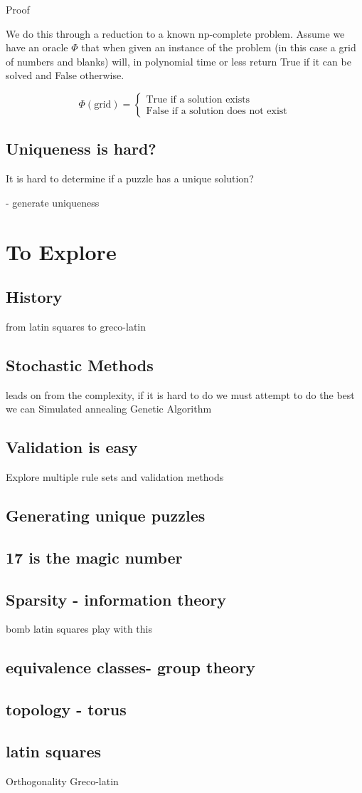 \documentclass[a4paper,12pt]{article}
\begin{document}
Proof

We do this through a reduction to a known np-complete problem.
Assume we have an oracle $\Phi$ that when given an instance of the problem (in this case a grid of numbers and blanks) will,
in polynomial time or less return True if it can be solved and False otherwise.

\begin{equation}
        \Phi (\text{grid}) = \begin{cases}
            \text{True if a solution exists} \\
            \text{False if a solution does not exist}
		\end{cases}
\end{equation}



\subsection{Uniqueness is hard?}
It is hard to determine if a puzzle has a unique solution?

- generate uniqueness

\section{To Explore}
\subsection{History}
from latin squares to greco-latin 
\subsection{Stochastic Methods}
leads on from the complexity, if it is hard to do we must attempt to do the best we can
Simulated annealing
Genetic Algorithm
\subsection{Validation is easy}
Explore multiple rule sets and validation methods
\subsection{Generating unique puzzles}
\subsection{17 is the magic number}
\subsection{Sparsity - information theory}
bomb latin squares play with this
\subsection{equivalence classes- group theory}
\subsection{topology - torus}
\subsection{latin squares}
Orthogonality 
Greco-latin
\end{document}
